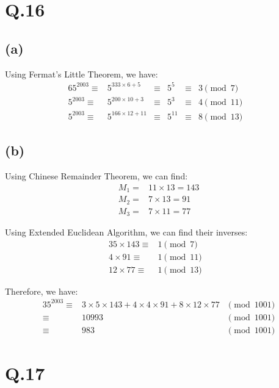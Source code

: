 \documentclass[a4paper,12pt]{article}
\begin{document}
\section*{Q.16}

\subsection*{(a)}

Using Fermat's Little Theorem, we have:
\begin{alignat*}{6}
	5^{2003} \equiv& 5^{333 \times 6 + 5} &\equiv& 5^5 &\equiv& 3 \pmod{7}& \\
	5^{2003} \equiv& 5^{200 \times 10 + 3} &\equiv& 5^3 &\equiv& 4 \pmod{11}& \\
	5^{2003} \equiv& 5^{166 \times 12 + 11} &\equiv& 5^{11} &\equiv& 8 \pmod{13}&
\end{alignat*}

\subsection*{(b)}

Using Chinese Remainder Theorem, we can find:
\begin{align*}
	M_1 =& 11 \times 13 = 143 \\
	M_2 =& 7 \times 13 = 91 \\
	M_3 =& 7 \times 11 = 77
\end{align*}

Using Extended Euclidean Algorithm, we can find their inverses:
\begin{alignat*}{3}
	5 \times 143 \equiv& 1 \pmod{7}& \\
	4 \times 91 \equiv& 1 \pmod{11}& \\
	12 \times 77 \equiv& 1 \pmod{13}&
\end{alignat*}

Therefore, we have:
\begin{alignat*}{3}
	5^{2003} \equiv& 3 \times 5 \times 143 + 4 \times 4 \times 91 + 8 \times 12 \times 77 &\pmod{1001} \\
	\equiv& 10993 &\pmod{1001} \\
	\equiv& 983 &\pmod{1001}
\end{alignat*}

\section*{Q.17}
\end{document}
